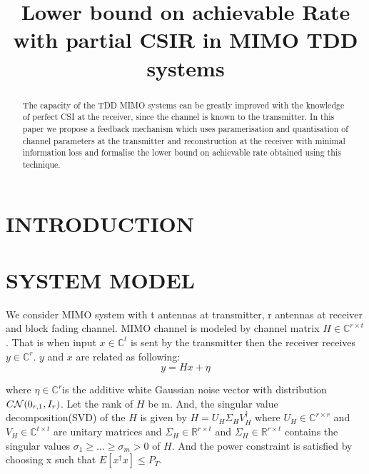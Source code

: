 \documentclass[letterpaper, 10 pt, conference]{ieeeconf}  %
\title{\LARGE \bf
Lower bound on achievable Rate with partial CSIR in MIMO TDD systems
}
\begin{document}
\maketitle
\thispagestyle{empty}
\pagestyle{empty}


\begin{abstract}
The capacity of the TDD MIMO systems can be greatly improved with the knowledge of perfect CSI at the receiver, since the channel is known to the transmitter. In this paper we propose a feedback mechanism which uses paramerisation and quantisation of channel parameters at the transmitter and reconstruction at the receiver with minimal information loss and formalise the lower bound on achievable rate obtained using this technique.

\end{abstract}


\section{INTRODUCTION}



\section{SYSTEM MODEL}
We consider MIMO system with t antennas at transmitter, r antennas at receiver and block fading channel. MIMO channel is modeled by channel matrix $H \in\mathbb{C}^{r \times t}$. That is when input $x \in \mathbb{C}^{t}$ is sent by the transmitter then the receiver receives $y \in \mathbb{C}^r$. $y$ and $x$ are related as following:
\begin{equation}
y = Hx + \eta
\end{equation} 

where $\eta \in \mathbb{C}^{r} $is the additive white Gaussian noise vector with distribution  $C{\cal N}(0_{r,1}, I_{r})$. Let the rank of $H$ be m. And, the singular value decomposition(SVD) of the $H$ is given by $H=U_{H}\Sigma_{H}V_{H}^{\dagger}$ where $U_{H}\in \mathbb{C}^{r\times r}$ and $V_{H}\in \mathbb{C}^{t\times t}$ are unitary matrices and $\Sigma_{H}\in \mathbb{R}^{r\times t}$ and $\Sigma_{H}\in \mathbb{R}^{r\times t}$ contains the singular values $\sigma_{1}\geq\ldots\geq\sigma_{m}>0$ of $H$. And the power constraint is satisfied by choosing x such that $E[x^{\dagger}x]\leq P_{{T}}$.
\end{document}
